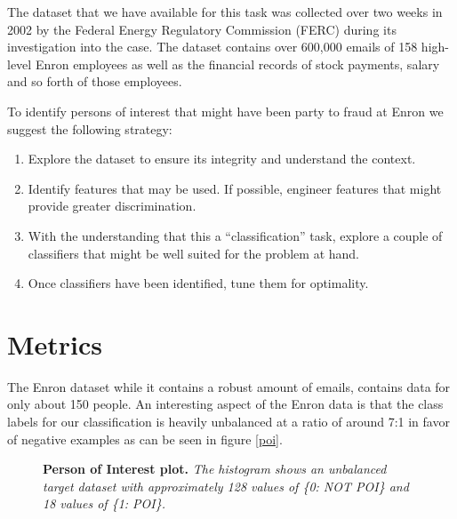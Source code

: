 \documentclass[twoside,openright,titlepage,numbers=noenddot,headinclude,%
               footinclude=true,cleardoublepage=empty,abstractoff,BCOR=5mm,%
               paper=a4,fontsize=11pt,ngerman,american]{scrreprt}
\numberwithin{theorem}{chapter}
\numberwithin{definition}{chapter}
\numberwithin{algorithm}{chapter}
\numberwithin{figure}{chapter}
\numberwithin{table}{chapter}
\numberwithin{equation}{chapter}
\begin{document}
The dataset that we have available for this task was collected over two weeks in 2002 by the Federal Energy Regulatory Commission (FERC) during its investigation into the case. The dataset contains over 600,000 emails of 158 high-level Enron employees as well as the financial records of stock payments, salary and so forth of those employees.

To identify persons of interest that might have been party to fraud at Enron we suggest the following strategy:
\begin{enumerate}%
\item Explore the dataset to ensure its integrity and understand the context.
\item Identify features that may be used. If possible, engineer features that might provide greater discrimination.
\item With the understanding that this a ``classification'' task, explore a couple of classifiers that might be well suited for the problem at hand.
\item Once classifiers have been identified, tune them for optimality.
\end{enumerate}



\section*{Metrics}

The Enron dataset while it contains a robust amount of emails, contains data for only about 150 people. An interesting aspect of the Enron data is that the class labels for our classification is heavily unbalanced at a ratio of around 7:1 in favor of negative examples as can be seen in figure \ref{poi}. 

\begin{figure}[!hbtp]
\centering
    
    \caption{\textbf{Person of Interest plot. }\textit{The histogram shows an unbalanced target dataset with approximately 128 values of \{0: NOT POI\} and 18 values of \{1: POI\}.}}
\end{figure}
\end{document}
